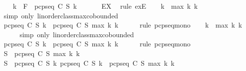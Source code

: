 \begin{isabellebody}
\ \ \isamarkupfalse%
\ k{}\ \ {\isachardoublequoteopen}F\ {\isasymin}\ pcp{\isacharunderscore}seq\ C\ S\ k{}{\isachardoublequoteclose}\ \isanewline
\ \ \ \ \isamarkupfalse%
\ EX{}\ \isamarkupfalse%
\ {\isacharparenleft}rule\ exE{\isacharparenright}\isanewline
\ \ \isamarkupfalse%
\ {\isachardoublequoteopen}k{}\ {\isasymle}\ max\ k{}\ k{}{\isachardoublequoteclose}\isanewline
\ \ \ \ \isamarkupfalse%
\ {\isacharparenleft}simp\ only{\isacharcolon}\ linorder{\isacharunderscore}class{\isachardot}max{\isachardot}cobounded{}{\isacharparenright}\isanewline
\ \ \isamarkupfalse%
\ \isamarkupfalse%
\ {\isachardoublequoteopen}pcp{\isacharunderscore}seq\ C\ S\ k{}\ {\isasymsubseteq}\ pcp{\isacharunderscore}seq\ C\ S\ {\isacharparenleft}max\ k{}\ k{}{\isacharparenright}{\isachardoublequoteclose}\isanewline
\ \ \ \ \isamarkupfalse%
\ {\isacharparenleft}rule\ pcp{\isacharunderscore}seq{\isacharunderscore}mono{\isacharparenright}\isanewline
\ \ \isamarkupfalse%
\ {\isachardoublequoteopen}k{}\ {\isasymle}\ max\ k{}\ k{}{\isachardoublequoteclose}\isanewline
\ \ \ \ \isamarkupfalse%
\ {\isacharparenleft}simp\ only{\isacharcolon}\ linorder{\isacharunderscore}class{\isachardot}max{\isachardot}cobounded{}{\isacharparenright}\isanewline
\ \ \isamarkupfalse%
\ \isamarkupfalse%
\ {\isachardoublequoteopen}pcp{\isacharunderscore}seq\ C\ S\ k{}\ {\isasymsubseteq}\ pcp{\isacharunderscore}seq\ C\ S\ {\isacharparenleft}max\ k{}\ k{}{\isacharparenright}{\isachardoublequoteclose}\isanewline
\ \ \ \ \isamarkupfalse%
\ {\isacharparenleft}rule\ pcp{\isacharunderscore}seq{\isacharunderscore}mono{\isacharparenright}\isanewline
\ \ \isamarkupfalse%
\ {\isachardoublequoteopen}S{\isacharprime}\ {\isasymsubseteq}\ pcp{\isacharunderscore}seq\ C\ S\ {\isacharparenleft}max\ k{}\ k{}{\isacharparenright}{\isachardoublequoteclose}\isanewline
\ \ \ \ \isamarkupfalse%
\ {\isacartoucheopen}S{\isacharprime}\ {\isasymsubseteq}\ pcp{\isacharunderscore}seq\ C\ S\ k{}{\isacartoucheclose}\ {\isacartoucheopen}pcp{\isacharunderscore}seq\ C\ S\ k{}\ {\isasymsubseteq}\ pcp{\isacharunderscore}seq\ C\ S\ {\isacharparenleft}max\ k{}\ k{}{\isacharparenright}{\isacartoucheclose}\ \isamarkupfalse%

\end{isabellebody}
